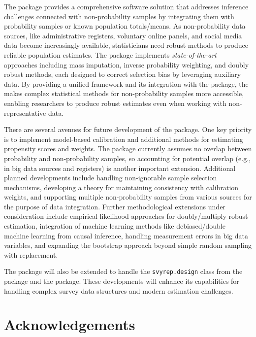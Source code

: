 \documentclass[
]{jss}
\begin{document}
The  package provides a comprehensive 
software solution that addresses inference challenges connected with
non-probability samples by integrating them with probability samples or
known population totals/means. As non-probability data sources, like
administrative registers, voluntary online panels, and social media data
become increasingly available, statisticians need robust methods to
produce reliable population estimates. The package implements
\textit{state-of-the-art} approaches including mass imputation, inverse
probability weighting, and doubly robust methods, each designed to
correct selection bias by leveraging auxiliary data. By providing a
unified framework and its integration with the  package, the
 makes complex statistical methods for non-probability
samples more accessible, enabling researchers to produce robust
estimates even when working with non-representative data.

There are several avenues for future development of the 
package. One key priority is to implement model-based calibration and
additional methods for estimating propensity scores and weights. The
package currently assumes no overlap between probability and
non-probability samples, so accounting for potential overlap (e.g., in
big data sources and registers) is another important extension.
Additional planned developments include handling non-ignorable sample
selection mechanisms, developing a theory for maintaining consistency
with calibration weights, and supporting multiple non-probability
samples from various sources for the purpose of data integration.
Further methodological extensions under consideration include empirical
likelihood approaches for doubly/multiply robust estimation, integration
of machine learning methods like debiased/double machine learning from
causal inference, handling measurement errors in big data variables, and
expanding the bootstrap approach beyond simple random sampling with
replacement.

The package will also be extended to handle the \texttt{svyrep.design}
class from the  package and the  package. These
developments will enhance its capabilities for handling complex survey
data structures and modern estimation challenges.

\section{Acknowledgements}\label{sec-acknowledgements}
\end{document}
